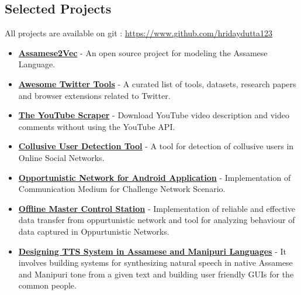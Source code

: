\documentclass[margin, centered]{res}
\begin{document}
\begin{resume}
\section{Selected Projects}
All projects are available on git : \url{https://www.github.com/hridaydutta123}
\begin{itemize}[leftmargin=*]

 \item \textbf{\href{https://github.com/hridaydutta123/Assamese2Vec}{Assamese2Vec}} - An open source project for modeling the Assamese Language.

 \item \textbf{\href{https://github.com/hridaydutta123/awesome-twitter-tools}{Awesome Twitter Tools}} - A curated list of tools, datasets, research papers and browser extensions related to Twitter.

 \item \textbf{\href{https://github.com/hridaydutta123/the-youtube-scraper}{The YouTube Scraper}} - Download YouTube video description and video comments without using the YouTube API.

 \item \textbf{\href{https://github.com/hridaydutta123/collusive-user-detection-tool}{Collusive User Detection Tool}} - A tool for detection of collusive users in Online Social Networks.

 \item \textbf{\href{https://github.com/ItsForkIT/pdm}{Opportunistic Network for Android Application}} - Implementation of Communication Medium for Challenge Network Scenario. 
 \item \textbf{\href{http://www.github.com/hridaydutta123/offlinemcs}{Offline Master Control Station}} - Implementation of reliable and effective data transfer from oppurtunistic network and tool for analyzing behaviour of data captured in Oppurtunistic Networks.
 \item \textbf{\href{http://www.iitg.ernet.in/cseweb/tts/tts/Assamese/}{Designing TTS System in Assamese and Manipuri Languages}} - It involves building systems for synthesizing natural speech in native Assamese and Manipuri tone from a given text and building user friendly GUIs for the common people.


\end{itemize}
\end{resume}
\end{document}
